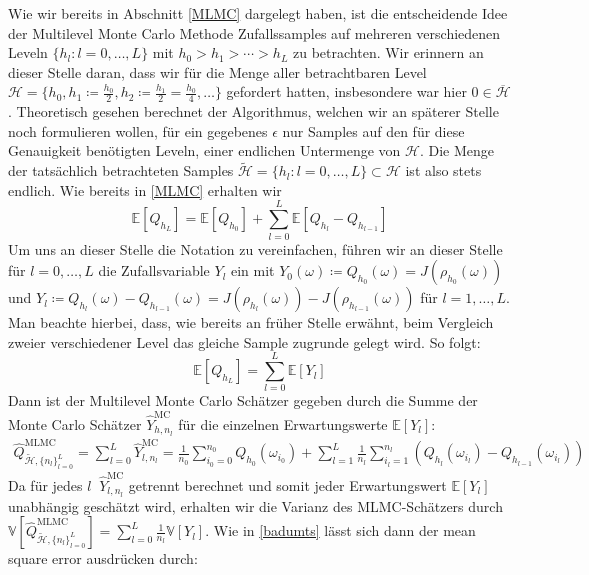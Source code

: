 Wie wir bereits in Abschnitt \ref{MLMC} dargelegt haben, ist die entscheidende Idee der Multilevel Monte Carlo Methode Zufallssamples auf mehreren verschiedenen Leveln $ \{ h_l \colon l = 0,\dots,L \} $ mit $ h_0 > h_1 > \cdots > h_L $ zu betrachten. Wir erinnern an dieser Stelle daran, dass wir für die Menge aller betrachtbaren Level $ \mathcal{H} = \{ h_0 , h_1 \coloneqq \frac{h_0}{2},h_2 \coloneqq \frac{h_1}{2} = \frac{h_0}{4}, \dots \} $ gefordert hatten, insbesondere war hier $0 \in \overline{\mathcal{H}}$. Theoretisch gesehen berechnet der Algorithmus, welchen wir an späterer Stelle noch formulieren wollen, für ein gegebenes $ \epsilon $ nur Samples auf den für diese Genauigkeit benötigten Leveln, einer endlichen Untermenge von $ \mathcal{H} $. Die Menge der tatsächlich betrachteten Samples $ \tilde{\mathcal{H}} = \{ h_l \colon l = 0,\dots,L \} \subset \mathcal{H} $ ist also stets endlich.
Wie bereits in \ref{MLMC} erhalten wir 
\[
\mathbb{E}[Q_{h_L}] = \mathbb{E}[Q_{h_0}] + \sum_ {l=0}^L \mathbb{E}[Q_{h_l}-Q_{h_{l-1}}]  
\]
Um uns an dieser Stelle die Notation zu vereinfachen, führen wir an dieser Stelle für $ l=0,\dots,L $ die Zufallsvariable $ Y_l $ ein mit $ Y_0(\omega) \coloneqq Q_{h_0}(\omega) = J(\rho_{h_0}(\omega)) $ und $ Y_l \coloneqq Q_{h_l}(\omega) - Q_{h_{l-1}}(\omega) =  J(\rho_{h_l}(\omega)) - J(\rho_{h_{l-1}}(\omega))  $ für $ l=1,\dots,L $. Man beachte hierbei, dass, wie bereits an früher Stelle erwähnt, beim Vergleich zweier verschiedener Level das gleiche Sample zugrunde gelegt wird. 
So folgt:
\[
	\mathbb{E}[Q_{h_L}] = \sum_{l=0}^L \mathbb{E}[Y_l]
\]
Dann ist der Multilevel Monte Carlo Schätzer gegeben durch die Summe der Monte Carlo Schätzer $ \widehat{Y}_{h,n_l}^{\text{MC}} $ für die einzelnen Erwartungswerte $ \mathbb{E}[Y_l] $:
\begin{align}
	\widehat{Q}_{\tilde{\mathcal{H}},\{ n_l \}_{l=0}^L }^{\text{MLMC}} = \sum_{l=0}^{L} \widehat{Y}_{l,n_l}^{\text{MC}} =  \frac{1}{n_0} \sum_{i_0=0}^{n_0} Q_{h_0}(\omega_{i_0}) + \sum_{l=1}^{L} \frac{1}{n_l} \sum_{i_l=1}^{n_l} \left( Q_{h_l}(\omega_{i_l}) - Q_{h_{l-1}}(\omega_{i_l})\right)
\end{align}
Da für jedes $ l \ $ $ \widehat{Y}_{l,n_l}^{\text{MC}} $ getrennt berechnet und somit jeder Erwartungswert $ \mathbb{E}[Y_l] $ unabhängig geschätzt wird, erhalten wir die Varianz des MLMC-Schätzers durch $\mathbb{V}[ \widehat{Q}_{\tilde{\mathcal{H}},\{ n_l \}_{l=0}^L }^{\text{MLMC}} ] = \sum_{l=0}^{L} \frac{1}{n_l} \mathbb{V}[Y_l]$. Wie in \ref{badumts} lässt sich dann der mean square error ausdrücken durch:
